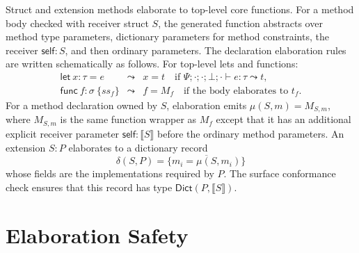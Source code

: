 \documentclass[manuscript,nonacm]{acmart}
\newcommand{\kw}[1]{\ensuremath{\mathsf{#1}}}
\newcommand{\emptyctx}{\cdot}
\newcommand{\has}{\vdash}
\newcommand{\elab}{\leadsto}
\newcommand{\trans}[1]{\llbracket #1 \rrbracket}
\newcommand{\Dict}{\mathsf{Dict}}
\begin{document}
Struct and extension methods elaborate to top-level core functions.
For a method body checked with receiver struct $S$, the generated function abstracts over method type parameters, dictionary parameters for method constraints, the receiver $\kw{self}:S$, and then ordinary parameters.
The declaration elaboration rules are written schematically as follows.
For top-level lets and functions:
\[
\begin{array}{rcl}
\kw{let}\ x:\tau=e &\elab& x=t
  \quad\text{if }\Psi;\emptyctx;\emptyctx;\bot;\emptyctx
  \has e:\tau\elab t,\\[1mm]
\kw{func}\ f:\sigma\ \{ss_f\} &\elab& f=M_f
  \quad\text{if the body elaborates to }t_f.
\end{array}
\]
For a method declaration owned by $S$, elaboration emits
$\mu(S,m)=M_{S,m}$, where $M_{S,m}$ is the same function wrapper as $M_f$ except that it has an additional explicit receiver parameter
$\kw{self}:\trans{S}$ before the ordinary method parameters.
An extension $S:P$ elaborates to a dictionary record
\[
  \delta(S,P)=\{\overline{m_i=\mu(S,m_i)}\}
\]
whose fields are the implementations required by $P$.
The surface conformance check ensures that this record has type $\Dict(P,\trans{S})$.

\section{Elaboration Safety}
\end{document}
